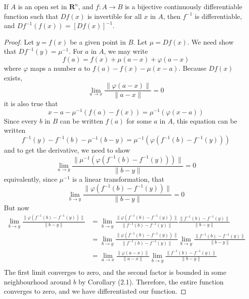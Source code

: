 \begin{lemma}
    If $A$ is an open set in $\mathbf{R}^n$, and $f:A \to B$ is a bijective continuously differentiable function such that $Df(x)$ is invertible for all $x$ in $A$, then $f^{-1}$ is differentiable, and $Df^{-1}(f(x)) = [Df(x)]^{-1}$.
\end{lemma}
\begin{proof}
    Let $y = f(x)$ be a given point in $B$. Let $\mu = Df(x)$. We need show that $Df^{-1}(y) = \mu^{-1}$. For $a$ in $A$, we may write
    \[ f(a) = f(x) + \mu(a - x) + \varphi(a - x) \]
    where $\varphi$ maps a number $a$ to $f(a) - f(x) - \mu(x - a)$. Because $Df(x)$ exists,
    \[ \lim_{a \to x} \frac{\|\varphi(a - x)\|}{\|a - x\|} = 0 \]
    it is also true that
    \[ x - a - \mu^{-1}(f(a) - f(x)) = \mu^{-1}(\varphi(x - a)) \]
    Since every $b$ in $B$ can be written $f(a)$ for some $a$ in $A$, this equation can be written
    \[ f^{-1}(y) - f^{-1}(b) - \mu^{-1}(b - y) = \mu^{-1}(\varphi(f^{-1}(b) - f^{-1}(y))) \]
    and to get the derivative, we need to show
    \[ \lim_{a \to y} \frac{\| \mu^{-1}(\varphi(f^{-1}(b) - f^{-1}(y))) \|}{\|b - y\|} = 0 \]
    equivalently, since $\mu^{-1}$ is a linear transformation, that
    \[ \lim_{b \to y} \frac{\| \varphi(f^{-1}(b) - f^{-1}(y)) \|}{\|b - y\|} = 0 \]
    But now
    \begin{align*}
        \lim_{b \to y} \frac{\| \varphi(f^{-1}(b) - f^{-1}(y)) \|}{\|b - y\|} &= \lim_{b \to y} \frac{\| \varphi(f^{-1}(b) - f^{-1}(y)) \|}{\|f^{-1}(b) - f^{-1}(y) \|} \frac{\|f^{-1}(b) - f^{-1}(y)\|}{\|b - y\|}\\
        &= \lim_{b \to y} \frac{\| \varphi(f^{-1}(b) - f^{-1}(y)) \|}{\|f^{-1}(b) - f^{-1}(y) \|} \lim_{b \to y} \frac{\|f^{-1}(b) - f^{-1}(y)\|}{\|b - y\|}\\
        &= \lim_{a \to x} \frac{\| \varphi(a - x) \|}{\|a - x \|} \lim_{b \to y} \frac{\|f^{-1}(b) - f^{-1}(y)\|}{\|b - y\|}\\
    \end{align*}
    The first limit converges to zero, and the second factor is bounded in some neighbourhood around $b$ by Corollary (2.1). Therefore, the entire function converges to zero, and we have differentiated our function.
\end{proof}

